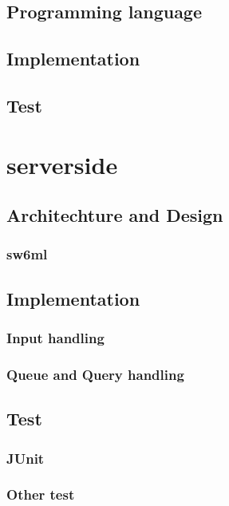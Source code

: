      \subsection{Programming language}
      
     \subsection{Implementation}
     \subsection{Test}
		

  \section{serverside} %
    
    \subsection{Architechture and Design}
      \label{sect:ssArchAndDesign}
      
      \subsubsection{sw6ml} %
         \label{sw6ml}
	  
	  
    \subsection{Implementation}
      \subsubsection{Input handling} %
		
      \subsubsection{Queue and Query handling} %
	  \label{QQHandling}
	    
    \subsection{Test}
      \subsubsection{JUnit}
      \subsubsection{Other test}

